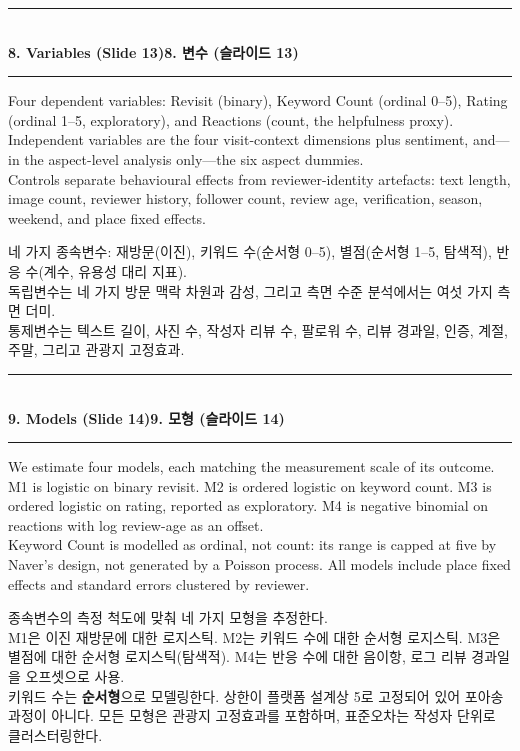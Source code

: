 \documentclass[10pt,a4paper]{article}
\newcommand{\sechead}[2]{%
  \vspace{6pt}%
  \noindent\rule{\linewidth}{0.6pt}\\[1pt]
  {\small\bfseries #1\hfill #2}\\[-3pt]
  \rule{\linewidth}{0.4pt}\par\vspace{2pt}%
}
\newcommand{\sent}[1]{#1\\[5pt]}
\newcommand{\bilingual}[2]{%
  \noindent%
  \begin{minipage}[t]{0.485\linewidth}
    \small #1
  \end{minipage}\hfill\vrule\hfill%
  \begin{minipage}[t]{0.483\linewidth}
    \small #2
  \end{minipage}\par\vspace{4pt}%
}
\begin{document}
\sechead{8. Variables (Slide 13)}{8. 변수 (슬라이드 13)}
\bilingual{%
  \sent{Four dependent variables: Revisit (binary), Keyword Count (ordinal 0--5), Rating (ordinal 1--5, exploratory), and Reactions (count, the helpfulness proxy).}
  \sent{Independent variables are the four visit-context dimensions plus sentiment, and---in the aspect-level analysis only---the six aspect dummies.}
  \sent{Controls separate behavioural effects from reviewer-identity artefacts: text length, image count, reviewer history, follower count, review age, verification, season, weekend, and place fixed effects.}
}{%
  \sent{네 가지 종속변수: 재방문(이진), 키워드 수(순서형 0--5), 별점(순서형 1--5, 탐색적), 반응 수(계수, 유용성 대리 지표).}
  \sent{독립변수는 네 가지 방문 맥락 차원과 감성, 그리고 측면 수준 분석에서는 여섯 가지 측면 더미.}
  \sent{통제변수는 텍스트 길이, 사진 수, 작성자 리뷰 수, 팔로워 수, 리뷰 경과일, 인증, 계절, 주말, 그리고 관광지 고정효과.}
}

\sechead{9. Models (Slide 14)}{9. 모형 (슬라이드 14)}
\bilingual{%
  \sent{We estimate four models, each matching the measurement scale of its outcome.}
  \sent{M1 is logistic on binary revisit. M2 is ordered logistic on keyword count. M3 is ordered logistic on rating, reported as exploratory. M4 is negative binomial on reactions with log review-age as an offset.}
  \sent{Keyword Count is modelled as ordinal, not count: its range is capped at five by Naver's design, not generated by a Poisson process. All models include place fixed effects and standard errors clustered by reviewer.}
}{%
  \sent{종속변수의 측정 척도에 맞춰 네 가지 모형을 추정한다.}
  \sent{M1은 이진 재방문에 대한 로지스틱. M2는 키워드 수에 대한 순서형 로지스틱. M3은 별점에 대한 순서형 로지스틱(탐색적). M4는 반응 수에 대한 음이항, 로그 리뷰 경과일을 오프셋으로 사용.}
  \sent{키워드 수는 \textbf{순서형}으로 모델링한다. 상한이 플랫폼 설계상 5로 고정되어 있어 포아송 과정이 아니다. 모든 모형은 관광지 고정효과를 포함하며, 표준오차는 작성자 단위로 클러스터링한다.}
}
\end{document}
